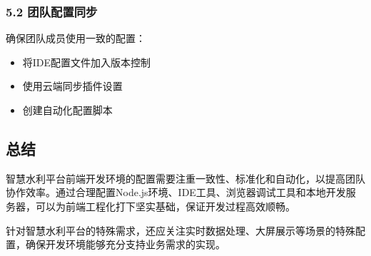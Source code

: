 \subsubsection{5.2
团队配置同步}\label{ux56e2ux961fux914dux7f6eux540cux6b65}

确保团队成员使用一致的配置：

\begin{itemize}
\tightlist
\item
  将IDE配置文件加入版本控制
\item
  使用云端同步插件设置
\item
  创建自动化配置脚本
\end{itemize}

\subsection{总结}\label{ux603bux7ed3}

智慧水利平台前端开发环境的配置需要注重一致性、标准化和自动化，以提高团队协作效率。通过合理配置Node.js环境、IDE工具、浏览器调试工具和本地开发服务器，可以为前端工程化打下坚实基础，保证开发过程高效顺畅。

针对智慧水利平台的特殊需求，还应关注实时数据处理、大屏展示等场景的特殊配置，确保开发环境能够充分支持业务需求的实现。
